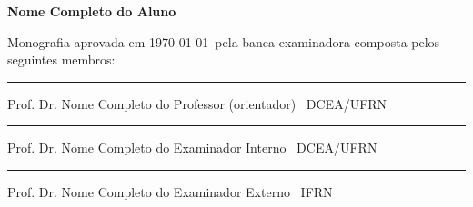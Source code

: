 
%
%
%
%

\begin{titlepage}

\begin{center}

\LARGE

\textbf{\titulo}

\vfill

\Large

\textbf{Nome Completo do Aluno}

\end{center}

\vfill

\noindent

Monografia aprovada em \today\ pela banca examinadora composta pelos
seguintes membros:

\begin{center}

\vspace{1.5cm}\rule{0.95\linewidth}{1pt}
\parbox{0.9\linewidth}{%
Prof. Dr. Nome Completo do Professor (orientador) \dotfill\ DCEA/UFRN}

\vspace{1.5cm}\rule{0.95\linewidth}{1pt}
\parbox{0.9\linewidth}{%
Prof. Dr. Nome Completo do Examinador Interno \dotfill\ DCEA/UFRN}

\vspace{1.5cm}\rule{0.95\linewidth}{1pt}
\parbox{0.9\linewidth}{%
Prof. Dr. Nome Completo do Examinador Externo \dotfill\ IFRN}

\end{center}

\end{titlepage}

